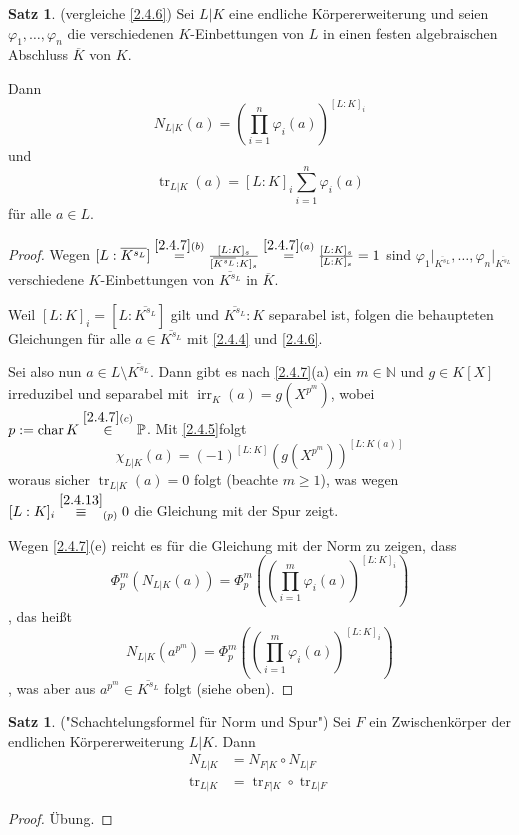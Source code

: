 \documentclass[
twoside=semi,
fontsize=12,
DIV=12, 
cleardoublepage=current,
leqno,
headings=optiontoheadandtoc, 
toc=idx
]{scrbook}
\newcommand{\N}{\mathbb{N}}
\renewcommand{\P}{\mathbb{P}}
\newcommand{\brac}[1]{\left( #1 \right)}
\DeclareMathOperator{\irr}{irr}
\DeclareMathOperator{\tr}{tr}
\DeclareMathOperator{\Char}{char}
\theoremstyle{definition}
\newtheorem{satz}[definition]{Satz}
\begin{document}
	\begin{satz}\label{2.4.14} (vergleiche \ref{2.4.6})\newline
		Sei $L|K$ eine endliche K\"orpererweiterung und seien $\varphi_1, \dots, \varphi_n$ die verschiedenen $K$-Einbettungen von $L$ in einen festen algebraischen Abschluss $\overline{K}$ von $K$.
		
		Dann 
			\[N_{L|K}(a) = \brac{\prod_{i=1}^n \varphi_i(a)}^{[L:K]_i} \]
		und
			\[\tr_{L|K}(a) = [L:K]_i \sum_{i=1}^n\varphi_i(a)\]
		f\"ur alle $a \in L$.
		
		\begin{proof}
			Wegen $[L: \overline{K^{s_L}}] \overset{\ref{2.4.7}(b)}{=} \frac{[L:K]_s}{[\overline{K^{s_L}}:K]_s} \overset{\ref{2.4.7}(a)}{=} \frac{[L:K]_s}{[L:K]_s} = 1$ sind 
			$\varphi_1\big|_{\overline{K^{s_L}}}, \dots, \varphi_n\big|_{\overline{K^{s_L}}}$ verschiedene $K$-Einbettungen von $\overline{K^{s_L}}$ in $\overline{K}$.
			
			Weil $[L:K]_i = [L:\overline{K^{s_L}}]$ gilt und $\overline{K^{s_L}}:K$ separabel ist, folgen die behaupteten Gleichungen f\"ur alle $a \in \overline{K^{s_L}}$ mit \ref{2.4.4} und \ref{2.4.6}.
			
			Sei also nun $a \in L \setminus \overline{K^{s_L}}$. Dann gibt es nach \ref{2.4.7}(a) ein $m \in \N$ und $g \in K[X]$ irreduzibel und separabel mit $\irr_K(a) = g(X^{p^m})$, wobei $p:= \Char K \overset{\ref{2.4.7}(c)}{\in} \P$. Mit \ref{2.4.5}folgt 
				\[\chi_{L|K}(a) = (-1)^{[L:K]}\brac{g(X^{p^m})}^{[L:K(a)]} \]
			woraus sicher $\tr_{L|K}(a) = 0$ folgt (beachte $m \geq 1$), was wegen $[L:K]_i \overset{\ref{2.4.13}}{\equiv}_{(p)} 0$ die Gleichung mit der Spur zeigt.
			
			Wegen \ref{2.4.7}(e) reicht es f\"ur die Gleichung mit der Norm zu zeigen, dass
				\[\Phi_p^m(N_{L|K}(a)) = \Phi_p^m\brac{\brac{\prod_{i=1}^m \varphi_i(a)}^{[L:K]_i} } \],
			das hei\ss t 
				\[N_{L|K}(a^{p^m}) = \Phi_p^m\brac{\brac{\prod_{i=1}^m \varphi_i(a)}^{[L:K]_i} }\]
			, was aber aus $a^{p^m} \in \overline{K^{s_L}}$ folgt (siehe oben).
		\end{proof}
	\end{satz}

	\begin{satz}\label{2.4.15} ("Schachtelungsformel f\"ur Norm und Spur")\newline
		Sei $F$ ein Zwischenk\"orper der endlichen K\"orpererweiterung $L|K$. Dann
			\begin{align*}
				N_{L|K} &= N_{F|K} \circ N_{L|F}\\
				\tr_{L|K} &= \tr_{F|K} \circ \tr_{L|F}
			\end{align*}
		\begin{proof}
			\"Ubung.
		\end{proof}
	\end{satz}
\end{document}
